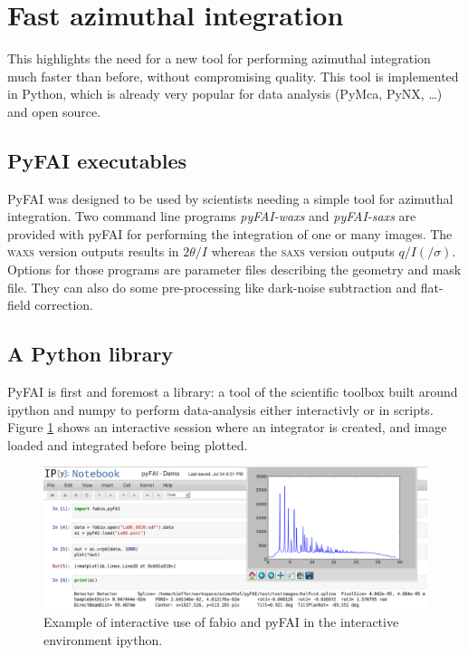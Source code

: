 \documentclass[a4paper]{jpconf}
\begin{document}
\section{Fast azimuthal integration}
This highlights the need for a new tool for performing azimuthal integration
much faster than before, without compromising quality. This tool is
implemented in Python, which is already very popular for data
analysis (PyMca\cite{pymca}, PyNX\cite{pynx}, \ldots) and open source.

\subsection{PyFAI executables}
PyFAI was designed to be used by scientists needing a simple tool for azimuthal
integration. Two command line programs \textit{pyFAI-waxs} and
\textit{pyFAI-saxs} are provided with pyFAI for performing the
integration of one or many images. The \textsc{waxs} version outputs results in
$2\theta /I$  whereas the \textsc{saxs} version outputs $q/I(/\sigma )$.
Options for those programs are parameter files describing the geometry and mask file. They can
also do some  pre-processing like dark-noise subtraction and flat-field correction.

\subsection{A Python library}
PyFAI is first and foremost a library: a tool of the scientific
toolbox built around ipython\cite{ipython} and numpy\cite{numpy} to 
perform data-analysis either interactivly or in scripts.
Figure \ref{notebook} shows an interactive session where an integrator is
created, and image loaded and integrated before being plotted.

\begin{figure}[h]
\begin{center}
\includegraphics[width=15cm]{img/notebook-l.eps}
\caption{\label{notebook} Example of interactive use of fabio and pyFAI in the
interactive environment ipython.}
\end{center}
\end{figure}
\end{document}
